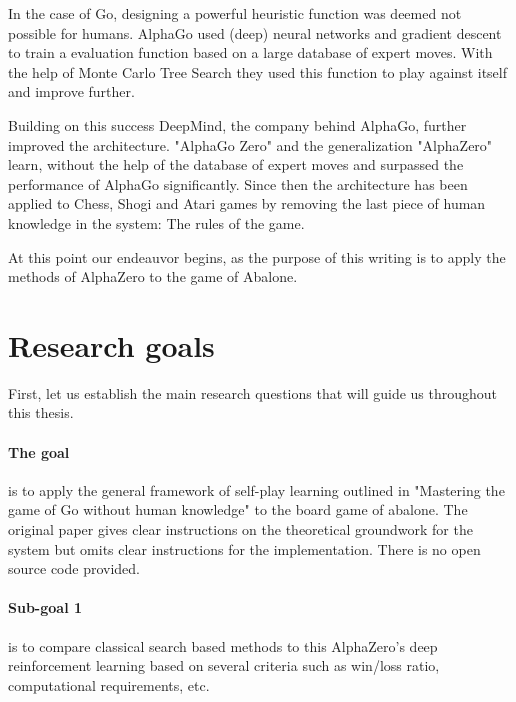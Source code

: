 In the case of Go, designing a powerful heuristic function was deemed not possible for humans. AlphaGo used (deep) neural networks and gradient descent to train a evaluation function based on a large database of expert moves. With the help of Monte Carlo Tree Search they used this function to play against itself and improve further. \cite{silver_mastering_2017}

Building on this success DeepMind, the company behind AlphaGo, further improved the architecture. "AlphaGo Zero" and the generalization "AlphaZero"  learn, without the help of the database of expert moves and surpassed the performance of AlphaGo significantly. Since then the architecture has been applied to Chess, Shogi and Atari games by removing the last piece of human knowledge in the system: The rules of the game. \cite{schrittwieser_mastering_2020}

At this point our endeauvor begins, as the purpose of this writing is to apply the methods of AlphaZero to the game of Abalone.

\section{Research goals}
First, let us establish the main research questions that will guide us throughout this thesis.

\paragraph{The goal} is to apply the general framework of self-play learning outlined in "Mastering the game of Go without human knowledge" to the board game of abalone. \cite{silver_mastering_2017} The original paper gives clear instructions on the theoretical groundwork for the system but omits clear instructions for the implementation. There is no open source code provided.

\paragraph{Sub-goal 1} is to compare classical search based methods to this AlphaZero's deep reinforcement learning based on several criteria such as win/loss ratio, computational requirements, etc.